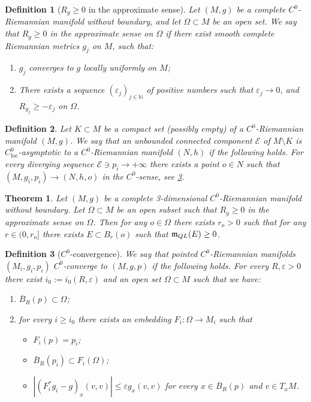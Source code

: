 \documentclass[10pt,a4paper]{amsart}
\newtheorem{definition}{Definition}
\newtheorem{theorem}{Theorem}
\begin{document}
\begin{definition}[$R_g\geq 0$ in the approximate sense]\label{def:NonnegativeScalInApproximate}
    Let $(M,g)$ be a complete $C^0$-Riemannian manifold without boundary, and let $\Omega\subset M$ be an open set. We say that \textit{$R_{g}\geq 0$ in the approximate sense on $\Omega$} if there exist
    smooth complete Riemannian metrics $g_j$ on $M$, such that: 
    \begin{enumerate}
        \item $g_j$ converges to $g$ locally uniformly on $M$;
        \item There exists a sequence $(\varepsilon_j)_{j\in\mathbb N}$ of positive numbers such that $\varepsilon_j\to 0$, and $R_{g_j}\geq -\varepsilon_j$ on $\Omega$.
    \end{enumerate}
\end{definition}

\begin{definition}\label{def:C0locasymptotic}
    Let $K\subset M$ be a compact set (possibly empty) of a $C^0$-Riemannian manifold $(M,g)$. We say that an unbounded connected component $\mathcal{E}$ of $M\setminus K$ is \textit{$C^{0}_{\mathrm{loc}}$-asymptotic to a $C^0$-Riemannian manifold $(N,h)$} if the following holds. For every diverging sequence $\mathcal{E}\ni p_i\to +\infty$ there exists a point $o\in N$ such that $(M,g_i,p_i)\to (N,h,o)$ in the $C^0$-sense, see \cref{def:C0locconvergence}.
\end{definition}

\begin{theorem}
\label{thm:small}
Let $(M,g)$ be a complete 3-dimensional $C^0$-Riemannian manifold without boundary. Let $\Omega \subset M$ be an open subset such that $R_g\ge0$ in the approximate sense on $\Omega$.
Then for any $o \in \Omega$ there exists $r_o>0$ such that for any $r \in (0,r_o]$ there exists $E \subset B_r(o)$ such that $\mathfrak{m}_{\rm QL}(E) \ge 0$.
\end{theorem}

\begin{definition}[$C^0$-convergence]\label{def:C0locconvergence}
We say that pointed $C^0$-Riemannian manifolds \textit{$(M_i,g_i,p_i)$ $C^{0}$-converge to $(M,g,p)$} if the following holds. For every $R,\varepsilon>0$ there exist $i_0:=i_0(R,\varepsilon)$ and an open set $\Omega\subset  M$ such that we have:
\begin{enumerate}
\item $\overline{B}_R(p)\subset  \Omega$;
\item for every $i\geq i_0$ there exists an embedding $F_i:\Omega\to M_i$ such that 
\begin{itemize}
\item $F_i(p)=p_i$;
\item $\overline{B}_R(p_i)\subset  F_i(\Omega)$;
\item $ |(F_i^*g_i-g)_x(v,v)|\leq\varepsilon g_x(v,v)$ for every $x\in \overline{B}_R(p)$ and $v\in T_xM$.
\end{itemize}
\end{enumerate}
\end{definition}
\end{document}
